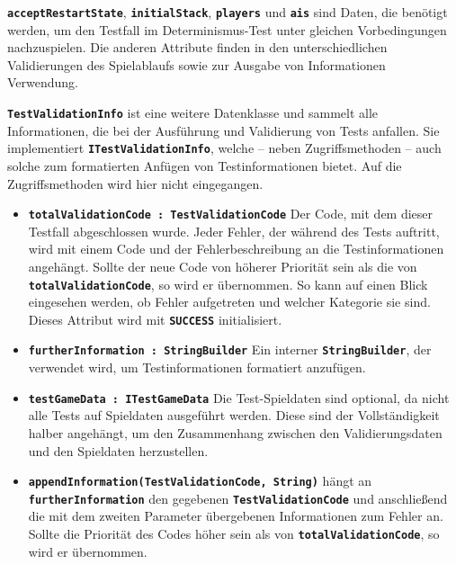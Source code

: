\documentclass[
							a4paper, 
							11pt, 
							openany, 
							liststotoc,
							parskip=half, 
   							headings=normal
						]{scrreprt}
\begin{document}
{\textbf{\texttt{acceptRestartState}}, \textbf{\texttt{initialStack}}, \textbf{\texttt{players}} und \textbf{\texttt{ais}} sind Daten, die benötigt werden, um den Testfall im Determinismus-Test unter gleichen Vorbedingungen nachzuspielen. Die anderen Attribute finden in den unterschiedlichen Validierungen des Spielablaufs sowie zur Ausgabe von Informationen Verwendung.\bigskip

\textbf{\texttt{TestValidationInfo}} ist eine weitere Datenklasse und sammelt alle Informationen, die bei der Ausführung und Validierung von Tests anfallen. Sie implementiert \textbf{\texttt{ITest\-Va\-li\-da\-ti\-on\-In\-fo}}, welche -- neben Zugriffsmethoden -- auch solche zum formatierten Anfügen von Testinformationen bietet. Auf die Zugriffsmethoden wird hier nicht eingegangen.
\begin{itemize}
	\item \textbf{\texttt{totalValidationCode : TestValidationCode}} Der Code, mit dem dieser Testfall abgeschlossen wurde. Jeder Fehler, der während des Tests auftritt, wird mit einem Code und der Fehlerbeschreibung an die Testinformationen angehängt. Sollte der neue Code von höherer Priorität sein als die von \textbf{\texttt{totalValidationCode}}, so wird er über\-nom\-men. So kann auf einen Blick eingesehen werden, ob Fehler aufgetreten und welcher Kategorie sie sind. Dieses Attribut wird mit \textbf{\texttt{SUCCESS}} initialisiert.
	\item \textbf{\texttt{furtherInformation : StringBuilder}} Ein interner \textbf{\texttt{StringBuilder}}, der verwendet wird, um Testinformationen formatiert anzufügen.
	\item \textbf{\texttt{testGameData : ITestGameData}} Die Test-Spieldaten sind optional, da nicht alle Tests auf Spieldaten ausgeführt werden. Diese sind der Vollständigkeit halber angehängt, um den Zusammenhang zwischen den Validierungsdaten und den Spieldaten herzustellen.
	\item \textbf{\texttt{appendInformation(TestValidationCode, String)}} hängt an \textbf{\texttt{fur\-ther\-In\-for\-ma\-ti\-on}} den gegebenen \textbf{\texttt{TestValidationCode}} und anschließend die mit dem zweiten Parameter übergebenen Informationen zum Fehler an. Sollte die Priorität des Codes höher sein als von \textbf{\texttt{totalValidationCode}}, so wird er übernommen. 
\end{itemize}\bigskip

}
\end{document}

